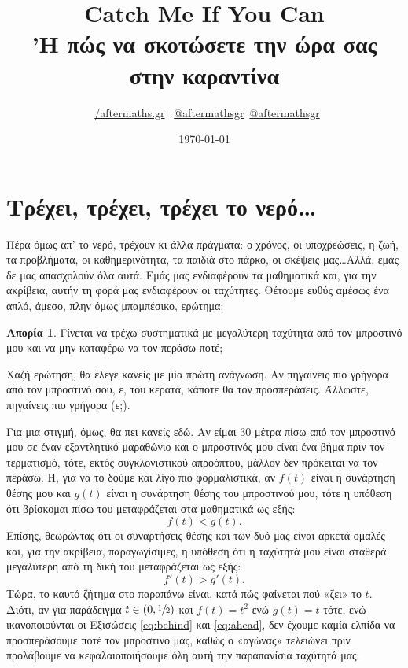 \documentclass[11pt,a4paper]{article}
\title{\Huge{\bf Catch Me If You Can}\\{\Large'Η πώς να σκοτώσετε την ώρα σας στην καραντίνα}}
\author{{\color{facebook}\faFacebook}\ \href{www.facebook.com/aftermaths.gr}{/aftermaths.gr} 
{\color{instagram}\faInstagram}\ \href{https://www.instagram.com/aftermathsgr}{@aftermathsgr} {\color{twitter}\faTwitter}\,\href{https://twitter.com/aftermathsgr}{@aftermathsgr}}
\date{\today}
\theoremstyle{definition}
\newtheorem{quest}{Απορία}[section]
\begin{document}
	\maketitle
	\section{Τρέχει, τρέχει, τρέχει το νερό\ldots}
	Πέρα όμως απ' το νερό, τρέχουν κι άλλα πράγματα: ο χρόνος, οι υποχρεώσεις, η ζωή, τα προβλήματα, οι καθημερινότητα, τα παιδιά στο πάρκο, οι σκέψεις μας\ldots Αλλά, εμάς δε μας απασχολούν όλα αυτά. Εμάς μας ενδιαφέρουν τα μαθηματικά και, για την ακρίβεια, αυτήν τη φορά μας ενδιαφέρουν οι ταχύτητες. Θέτουμε ευθύς αμέσως ένα απλό, άμεσο, πλην όμως μπαμπέσικο, ερώτημα:
	\begin{quest}\label{quest:velocity}
		Γίνεται να τρέχω συστηματικά με μεγαλύτερη ταχύτητα από τον μπροστινό μου και να μην καταφέρω να τον περάσω ποτέ;
	\end{quest}
	Χαζή ερώτηση, θα έλεγε κανείς με μία πρώτη ανάγνωση. Αν πηγαίνεις πιο γρήγορα από τον μπροστινό σου, ε, του κερατά, κάποτε θα τον προσπεράσεις. Άλλωστε, πηγαίνεις πιο γρήγορα (ε;).
	
	Για μια στιγμή, όμως, θα πει κανείς εδώ. Αν είμαι 30 μέτρα πίσω από τον μπροστινό μου σε έναν εξαντλητικό μαραθώνιο και ο μπροστινός μου είναι ένα βήμα πριν τον τερματισμό, τότε, εκτός συγκλονιστικού απροόπτου, μάλλον δεν πρόκειται να τον περάσω. Ή, για να το δούμε και λίγο πιο φορμαλιστικά, αν $f(t)$ είναι η συνάρτηση θέσης μου και $g(t)$ είναι η συνάρτηση θέσης του μπροστινού μου, τότε η υπόθεση ότι βρίσκομαι πίσω του μεταφράζεται στα μαθηματικά ως εξής:
	\begin{equation}\label{eq:behind}
	f(t)<g(t).
	\end{equation}
	Επίσης, θεωρώντας ότι οι συναρτήσεις θέσης και των δυό μας είναι αρκετά ομαλές και, για την ακρίβεια, παραγωγίσιμες, η υπόθεση ότι η ταχύτητά μου είναι σταθερά μεγαλύτερη από τη δική του μεταφράζεται ως εξής:
	\begin{equation}\label{eq:ahead}
	f'(t)>g'(t).
	\end{equation}
	Τώρα, το καυτό ζήτημα στο παραπάνω είναι, κατά πώς φαίνεται πού «ζει» το $t$. Διότι, αν για παράδειγμα $t\in(0,\sfrac{1}{2})$ και $f(t)=t^2$ ενώ $g(t)=t$ τότε, ενώ ικανοποιούνται οι Εξισώσεις \eqref{eq:behind} και \eqref{eq:ahead}, δεν έχουμε καμία ελπίδα να προσπεράσουμε ποτέ τον μπροστινό μας, καθώς ο «αγώνας» τελειώνει πριν προλάβουμε να κεφαλαιοποιήσουμε όλη αυτή την παραπανίσια ταχύτητά μας.
	
\end{document}
